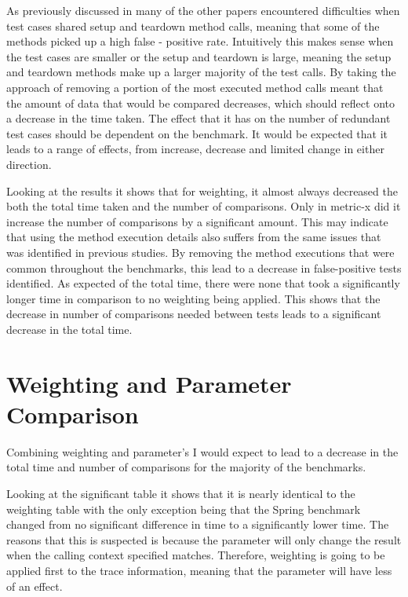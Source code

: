 As previously discussed in  many of the other papers encountered difficulties when test cases shared setup and teardown method calls, meaning that some of the methods picked up a high false - positive rate. Intuitively this makes sense when the test cases are smaller or the setup and teardown is large, meaning the setup and teardown methods make up a larger majority of the test calls. By taking the approach of removing a portion of the most executed method calls meant that the amount of data that would be compared decreases, which should reflect onto a decrease in the time taken. The effect that it has on the number of redundant test cases should be dependent on the benchmark. It would be expected that it leads to a range of effects, from increase, decrease and limited change in either direction.

Looking at the results it shows that for weighting, it almost always decreased the both the total time taken and the number of comparisons. Only in metric-x did it increase the number of comparisons by a significant amount. This may indicate that using the method execution details also suffers from the same issues that was identified in previous studies. By removing the method executions that were common throughout the benchmarks, this lead to a decrease in false-positive tests identified. As expected of the total time, there were none that took a significantly longer time in comparison to no weighting being applied. This shows that the decrease in number of comparisons needed between tests leads to a significant decrease in the total time.


\section{Weighting and Parameter Comparison}

Combining weighting and parameter’s I would expect to lead to a decrease in the total time and number of comparisons for the majority of the benchmarks. 

Looking at the significant table it shows that it is nearly identical to the weighting table with the only exception being that the Spring benchmark changed from no significant difference in time to a significantly lower time. The reasons that this is suspected is because the parameter will only change the result when the calling context specified matches. Therefore, weighting is going to be applied first to the trace information, meaning that the parameter will have less of an effect.

